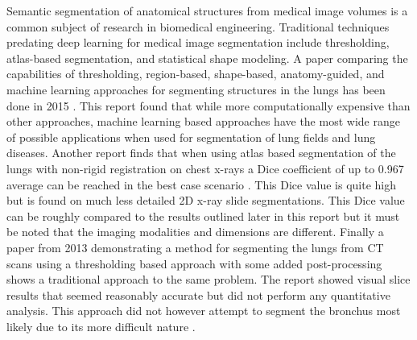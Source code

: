 
Semantic segmentation of anatomical structures from medical image volumes is a common subject of research in biomedical engineering. Traditional techniques predating deep learning for medical image segmentation include thresholding, atlas-based segmentation, and statistical shape modeling. A paper comparing the capabilities of thresholding, region-based, shape-based, anatomy-guided, and machine learning approaches for segmenting structures in the lungs has been done in 2015 \cite{comparison:article_typical}. This report found that while more computationally expensive than other approaches, machine learning based approaches have the most wide range of possible applications when used for segmentation of lung fields and lung diseases. \newline
Another report finds that when using atlas based segmentation of the lungs with non-rigid registration on chest x-rays a Dice coefficient of up to 0.967 average can be reached in the best case scenario \cite{atlas}. This Dice value is quite high but is found on much less detailed 2D x-ray slide segmentations. This Dice value can be roughly compared to the results outlined later in this report but it must be noted that the imaging modalities and dimensions are different. \newline
Finally a paper from 2013 demonstrating a method for segmenting the lungs from CT scans using a thresholding based approach with some added post-processing shows a traditional approach to the same problem. The report showed visual slice results that seemed reasonably accurate but did not perform any quantitative analysis. This approach did not however attempt to segment the bronchus most likely due to its more difficult nature \cite{threshold}.